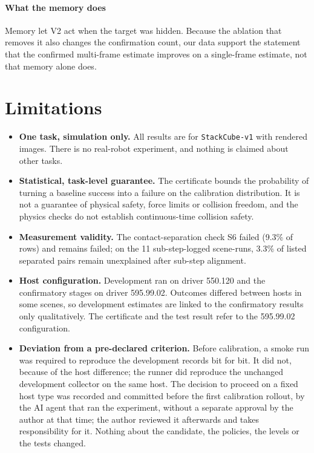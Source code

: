 \documentclass[preprint,12pt]{elsarticle}
\begin{document}
\paragraph{What the memory does} Memory let V2 act when the target was hidden. Because the ablation that removes it also changes the confirmation count, our data support the statement that the confirmed multi-frame estimate improves on a single-frame estimate, not that memory alone does.

\section{Limitations}\label{sec:limits}

\begin{itemize}
\item \textbf{One task, simulation only.} All results are for \texttt{StackCube-v1} with rendered images. There is no real-robot experiment, and nothing is claimed about other tasks.
\item \textbf{Statistical, task-level guarantee.} The certificate bounds the probability of turning a baseline success into a failure on the calibration distribution. It is not a guarantee of physical safety, force limits or collision freedom, and the physics checks do not establish continuous-time collision safety.
\item \textbf{Measurement validity.} The contact-separation check S6 failed (9.3\% of rows) and remains failed; on the 11 sub-step-logged scene-runs, 3.3\% of listed separated pairs remain unexplained after sub-step alignment.
\item \textbf{Host configuration.} Development ran on driver 550.120 and the confirmatory stages on driver 595.99.02. Outcomes differed between hosts in some scenes, so development estimates are linked to the confirmatory results only qualitatively. The certificate and the test result refer to the 595.99.02 configuration.
\item \textbf{Deviation from a pre-declared criterion.} Before calibration, a smoke run was required to reproduce the development records bit for bit. It did not, because of the host difference; the runner did reproduce the unchanged development collector on the same host. The decision to proceed on a fixed host type was recorded and committed before the first calibration rollout, by the AI agent that ran the experiment, without a separate approval by the author at that time; the author reviewed it afterwards and takes responsibility for it. Nothing about the candidate, the policies, the levels or the tests changed.

\end{itemize}
\end{document}
